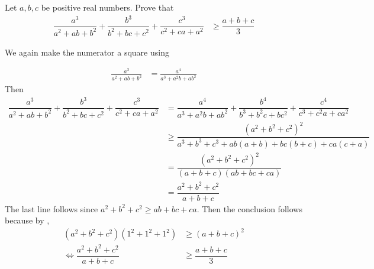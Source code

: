 \documentclass{subfile}
\begin{document}
		\begin{problem}
			Let $a,b,c$ be positive real numbers. Prove that
				\begin{align*}
					\dfrac{a^{3}}{a^{2}+ab+b^{2}}+\dfrac{b^{3}}{b^{2}+bc+c^{2}}+\dfrac{c^{3}}{c^{2}+ca+a^{2}}
						& \geq \dfrac{a+b+c}{3}
				\end{align*}

				\begin{solution}
					We again make the numerator a square using
					
						\begin{align*}
							\frac{a^{3}}{a^{2}+ab+b^{2}}
								& =\frac{a^{4}}{a^{3}+a^{2}b+ab^{2}}
						\end{align*}
					Then
						\begin{align*}
							\dfrac{a^{3}}{a^{2}+ab+b^{2}}+\dfrac{b^{3}}{b^{2}+bc+c^{2}}+\dfrac{c^{3}}{c^{2}+ca+a^{2}}
								& = \dfrac{a^{4}}{a^{3}+a^{2}b+ab^{2}}+\dfrac{b^{4}}{b^{3}+b^{2}c+bc^{2}}+\dfrac{c^{4}}{c^{3}+c^{2}a+ca^{2}}\\
								& \geq \dfrac{(a^{2}+b^{2}+c^{2})^{2}}{a^{3}+b^{3}+c^{3}+ab(a+b)+bc(b+c)+ca(c+a)}\\
								& = \dfrac{(a^{2}+b^{2}+c^{2})^{2}}{(a+b+c)(ab+bc+ca)}\\
								& = \dfrac{a^{2}+b^{2}+c^{2}}{a+b+c}
						\end{align*}
					The last line follows since $a^{2}+b^{2}+c^{2}\geq ab+bc+ca$. Then the conclusion follows because by ,
						\begin{align*}
							(a^{2}+b^{2}+c^{2})(1^{2}+1^{2}+1^{2})
								& \geq (a+b+c)^{2}\\
							\iff \dfrac{a^{2}+b^{2}+c^{2}}{a+b+c}
								& \geq \dfrac{a+b+c}{3}
						\end{align*}
				\end{solution}
		\end{problem}
\end{document}
